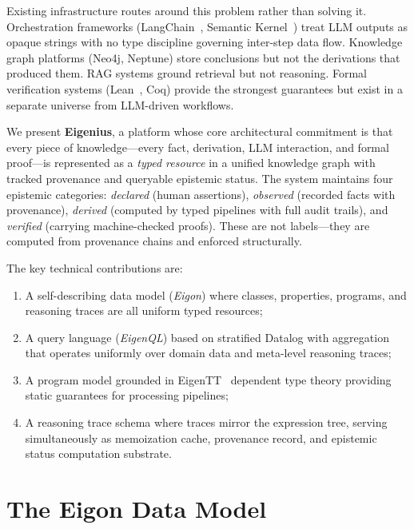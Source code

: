 \documentclass[10pt,twocolumn,letterpaper]{article}
\begin{document}
Existing infrastructure routes around this problem rather than solving it.
Orchestration frameworks (LangChain~\cite{langchain}, Semantic Kernel~\cite{semantickernel}) treat LLM outputs as opaque strings with no type discipline governing inter-step data flow.
Knowledge graph platforms (Neo4j, Neptune) store conclusions but not the derivations that produced them.
RAG systems ground retrieval but not reasoning.
Formal verification systems (Lean~\cite{lean4}, Coq) provide the strongest guarantees but exist in a separate universe from LLM-driven workflows.

We present \textbf{Eigenius}, a platform whose core architectural commitment is that every piece of knowledge---every fact, derivation, LLM interaction, and formal proof---is represented as a \emph{typed resource} in a unified knowledge graph with tracked provenance and queryable epistemic status.
The system maintains four epistemic categories:
\emph{declared} (human assertions),
\emph{observed} (recorded facts with provenance),
\emph{derived} (computed by typed pipelines with full audit trails),
and \emph{verified} (carrying machine-checked proofs).
These are not labels---they are computed from provenance chains and enforced structurally.

The key technical contributions are:
\begin{enumerate}
  \item A self-describing data model (\emph{Eigon}) where classes, properties, programs, and reasoning traces are all uniform typed resources;
  \item A query language (\emph{EigenQL}) based on stratified Datalog with aggregation that operates uniformly over domain data and meta-level reasoning traces;
  \item A program model grounded in EigenTT~\cite{minitt} dependent type theory providing static guarantees for processing pipelines;
  \item A reasoning trace schema where traces mirror the expression tree, serving simultaneously as memoization cache, provenance record, and epistemic status computation substrate.
\end{enumerate}


\section{The Eigon Data Model}
\label{sec:eigon}
\end{document}
